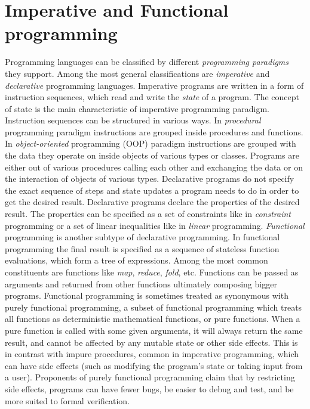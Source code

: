 \section{Imperative and Functional programming}
\label{background_programming_paradigms}
\quad Programming languages can be classified by different \textit{programming paradigms} they support. Among the most general classifications are \textit{imperative} and \textit{declarative} programming languages.\newline\null
\quad Imperative programs are written in a form of instruction sequences, which read and write the \textit{state} of a program. The concept of state is the main characteristic of imperative programming paradigm. Instruction sequences can be structured in various ways. In \textit{procedural} programming paradigm instructions are grouped inside procedures and functions. In \textit{object-oriented} programming (OOP) paradigm instructions are grouped with the data they operate on inside objects of various types or classes. Programs are either out of various procedures calling each other and exchanging the data or on the interaction of objects of various types.\newline\null
\quad Declarative programs do not specify the exact sequence of steps and state updates a program needs to do in order to get the desired result. Declarative programs declare the properties of the desired result. The properties can be specified as a set of constraints like in \textit{constraint} programming or a set of linear inequalities like in \textit{linear} programming. \textit{Functional} programming is another subtype of declarative programming. In functional programming the final result is specified as a sequence of stateless function evaluations, which form a tree of expressions. Among the most common constituents are functions like \textit{map}, \textit{reduce}, \textit{fold}, etc. Functions can be passed as arguments and returned from other functions ultimately composing bigger programs.\newline\null
\quad Functional programming is sometimes treated as synonymous with purely functional programming, a subset of functional programming which treats all functions as deterministic mathematical functions, or pure functions. When a pure function is called with some given arguments, it will always return the same result, and cannot be affected by any mutable state or other side effects. This is in contrast with impure procedures, common in imperative programming, which can have side effects (such as modifying the program's state or taking input from a user). Proponents of purely functional programming claim that by restricting side effects, programs can have fewer bugs, be easier to debug and test, and be more suited to formal verification.\newline\null
